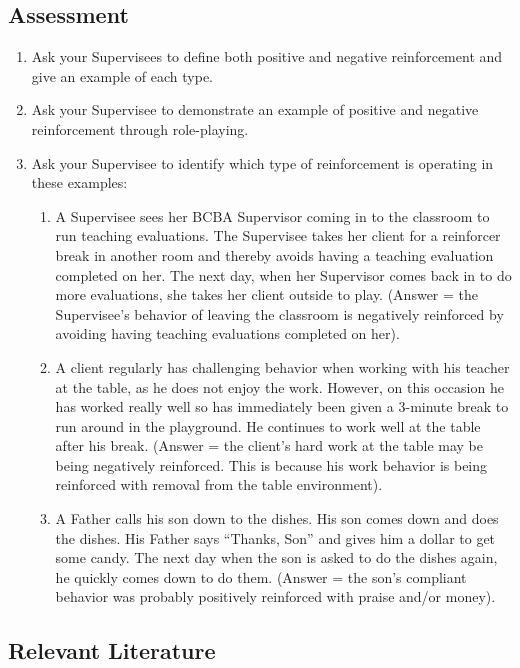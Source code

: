 \subsection{Assessment}
\begin{enumerate}
\item Ask your Supervisees to define both positive and negative reinforcement and give an example of each type.
\item Ask your Supervisee to demonstrate an example of positive and negative reinforcement through role-playing.
\item Ask your Supervisee to identify which type of reinforcement is operating in these examples:
\begin{enumerate}
\item A Supervisee sees her BCBA Supervisor coming in to the classroom to run teaching evaluations. The Supervisee takes her client for a reinforcer break in another room and thereby avoids having a teaching evaluation completed on her. The next day, when her Supervisor comes back in to do more evaluations, she takes her client outside to play. (Answer = the Supervisee's behavior of leaving the classroom is negatively reinforced by avoiding having teaching evaluations completed on her).
\item A client regularly has challenging behavior when working with his teacher at the table, as he does not enjoy the work. However, on this occasion he has worked really well so has immediately been given a 3-minute break to run around in the playground. He continues to work well at the table after his break. (Answer = the client's hard work at the table may be being negatively reinforced. This is because his work behavior is being reinforced with removal from the table environment). 
\item A Father calls his son down to the dishes. His son comes down and does the dishes. His Father says ``Thanks, Son'' and gives him a dollar to get some candy. The next day when the son is asked to do the dishes again, he quickly comes down to do them. (Answer = the son's compliant behavior was probably positively reinforced with praise and/or money).
\end{enumerate}
\end{enumerate}
%
\subsection{Relevant Literature}
\begin{refsection}
\nocite{hall1968effects,
    hart1968effect,
    michael1975positive,
    osborne1969free,
    skinner1938,
    thomas1968production}
\printbibliography[heading=none]
\end{refsection}
%
